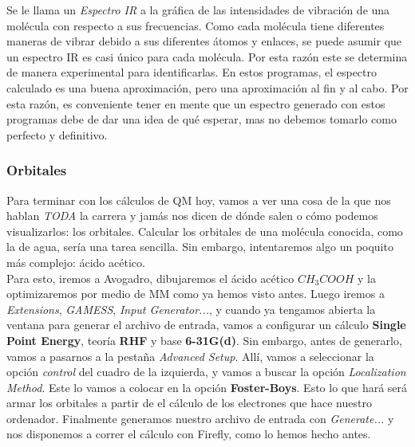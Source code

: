 \documentclass[10pt,letterpaper]{article}
\begin{document}
Se le llama un \emph{Espectro IR} a la gr\'afica de las intensidades de vibraci\'on de una mol\'ecula con respecto a sus frecuencias. Como cada mol\'ecula tiene diferentes maneras de vibrar debido a sus diferentes \'atomos y enlaces, se puede asumir que un espectro IR es casi \'unico para cada mol\'ecula. Por esta raz\'on este se determina de manera experimental para identificarlas. En estos programas, el espectro calculado es  una buena aproximaci\'on, pero una aproximaci\'on al fin y al cabo. Por esta raz\'on, es conveniente tener en mente que un espectro generado con estos programas debe de dar una idea de qu\'e esperar, mas no debemos tomarlo como perfecto y definitivo.

\subsubsection{Orbitales}
Para terminar con los c\'alculos de QM hoy, vamos a ver una cosa de la que nos hablan \textit{TODA} la carrera y jam\'as nos dicen de d\'onde salen o c\'omo podemos visualizarlos: los orbitales. Calcular los orbitales de una mol\'ecula conocida, como la de agua, ser\'ia una tarea sencilla. Sin embargo, intentaremos algo un poquito m\'as complejo: \'acido ac\'etico.\\

Para esto, iremos a Avogadro, dibujaremos el \'acido ac\'etico $ CH_3 COOH $ y la optimizaremos por medio de MM como ya hemos visto antes. Luego iremos a \textit{Extensions}, \textit{GAMESS}, \textit{Input Generator...}, y cuando ya tengamos abierta la ventana para generar el archivo de entrada, vamos a configurar un c\'alculo \textbf{Single Point Energy}, teor\'ia \textbf{RHF} y base \textbf{6-31G(d)}. Sin embargo, antes de generarlo, vamos a pasarnos a la pesta\~na \textit{Advanced Setup}. All\'i, vamos a seleccionar la opci\'on \textit{control} del cuadro de la izquierda, y vamos a buscar la opci\'on \textit{Localization Method}. Este lo vamos a colocar en la opci\'on \textbf{Foster-Boys}. Esto lo que har\'a ser\'a armar los orbitales a partir de el c\'alculo de los electrones que hace nuestro ordenador. Finalmente generamos nuestro archivo de entrada con \textit{Generate...} y nos disponemos a correr el c\'alculo con Firefly, como lo hemos hecho antes.\\
\end{document}
